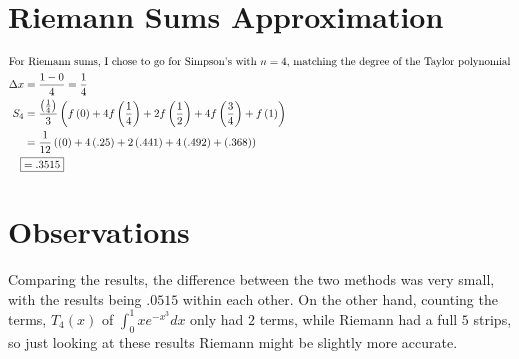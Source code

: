 \documentclass[12pt]{article}
\begin{document}
\section{Riemann Sums Approximation}
\begin{align}
  \intertext{For Riemann sums, I chose to go for Simpson's with $n=4$, matching the degree of the Taylor polynomial}
  \Delta x                & =\frac{1-0}{4}=\frac{1}{4}                                                                                                                                               \\
  S_{4}                              & =\frac{\left(\frac{1}{4}\right)}{3}\left(f\left(0\right)+4f\left(\frac{1}{4}\right)+2f\left(\frac{1}{2}\right)+4f\left(\frac{3}{4}\right)+f\left(1\right)\right)         \\
                                     & =\frac{1}{12}\left(\left(0\right)+4\left(.25\right)+2\left(.441\right)+4\left(.492\right)+\left(.368\right)\right)                                                       \\
                                     \Aboxed{& =.3515}                                                                                                                                                                   
\end{align}

\section{Observations}
Comparing the results, the difference between the two methods was very small, with the results being $.0515$ within each other. On the other hand, counting the terms, $T_4(x)$ of $\int_{0}^{1}xe^{-x^{3}}dx$ only had $2$ terms, while Riemann had a full $5$ strips, so just looking at these results Riemann might be slightly more accurate.
\end{document}
